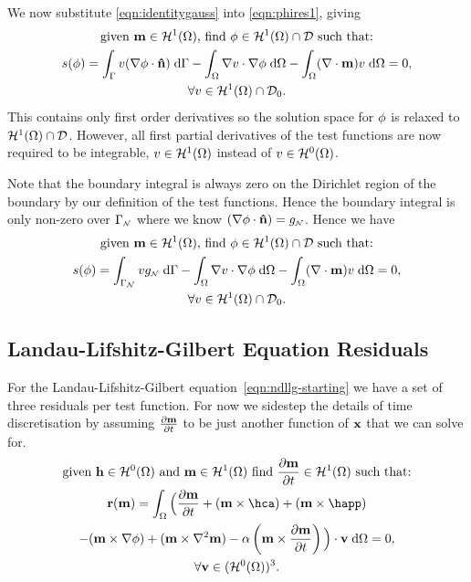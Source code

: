 We now substitute \eqref{eqn:identitygauss} into \eqref{eqn:phires1}, giving
\begin{gather}
  \text{given $\mathbf{m} \in \mathcal{H}^1(\Omega)$, find $\phi \in \mathcal{H}^1(\Omega) \cap \mathcal{D}$ such that:} \notag \\
  s(\phi) = \int_{{\Gamma}} v (\nabla \phi \cdot \mathbf{\hat{n}}) {\; \text{d}} {\Gamma}
  - \int_\Omega \nabla v \cdot \nabla \phi {\; \text{d}} \Omega
  - \int_\Omega (\nabla \cdot \mathbf{m}) v {\; \text{d}} \Omega = 0
  , \notag \\
  \forall v \in \mathcal{H}^1(\Omega) \cap \mathcal{D}_0. \notag
\end{gather}
This contains only first order derivatives so the solution space for $\phi$ is relaxed to $\mathcal{H}^1(\Omega) \cap \mathcal{D}$. However, all first partial derivatives of the test functions are now required to be integrable, \ie $v \in \mathcal{H}^1(\Omega)$ instead of $v \in \mathcal{H}^0(\Omega)$.

Note that the boundary integral is always zero on the Dirichlet region of the boundary by our definition of the test functions. Hence the boundary integral is only non-zero over ${\Gamma}_{{\scriptscriptstyle{\mathcal{N}}}}$ where we know $(\nabla \phi \cdot \mathbf{\hat{n}}) = g_{{\scriptscriptstyle{\mathcal{N}}}}$. Hence we have
\begin{gather}
  \text{given $\mathbf{m} \in \mathcal{H}^1(\Omega)$, find $\phi \in \mathcal{H}^1(\Omega) \cap \mathcal{D}$ such that:} \notag \\
  s(\phi) = \int_{{\Gamma}_{\scriptscriptstyle{\mathcal{N}}}} v g_{\scriptscriptstyle{\mathcal{N}}} {\; \text{d}} {\Gamma}
  - \int_\Omega \nabla v \cdot \nabla \phi {\; \text{d}} \Omega
  - \int_\Omega (\nabla \cdot \mathbf{m}) v {\; \text{d}} \Omega = 0
  , \label{res:contphi} \\
  \forall v \in \mathcal{H}^1(\Omega) \cap \mathcal{D}_0. \notag
\end{gather}


\subsection{Landau-Lifshitz-Gilbert Equation Residuals}

For the Landau-Lifshitz-Gilbert equation~\eqref{eqn:ndllg-starting} we have a set of three residuals per test function. For now we sidestep the details of time discretisation by assuming $\frac{\partial \mathbf{m}}{\partial t}$ to be just another function of $\mathbf{x}$ that we can solve for.
\begin{gather}
  \text{given $\hv \in \sob^0(\magd)$ and $\mv \in \sob^1(\magd)$ find $\dmdt \in \sob^1(\magd)$ such that:} \notag
  \\
  \rllg(\mv) = \int_\magd \Big( \dmdt
  + (\mv \times \hca) + (\mv \times \happ) \\
  - (\mv \times \nabla \phi) + (\mv \times \lap \mv)
  - \dampc \left( \mv \times \dmdt \right)
  \Big) \cdot \testv \d\magd
  = 0, \label{res:contllg}
  \\
  \forall \testv \in (\sob^0(\magd))^3. \notag
\end{gather}

